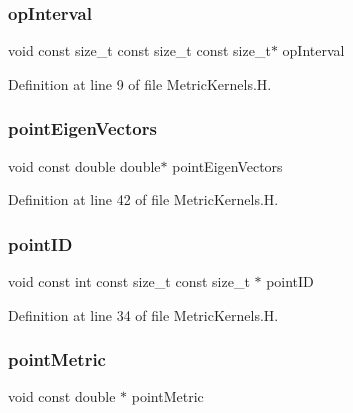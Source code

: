 \subsubsection{\texorpdfstring{op\+Interval}{opInterval}}
{\footnotesize\ttfamily void const size\+\_\+t const size\+\_\+t const size\+\_\+t$\ast$ op\+Interval}



Definition at line 9 of file Metric\+Kernels.\+H.

\hypertarget{MetricKernels_8H_a54f8f8da2da23aec4d7ad54db95b3d46}{}\label{MetricKernels_8H_a54f8f8da2da23aec4d7ad54db95b3d46} 
\subsubsection{\texorpdfstring{point\+Eigen\+Vectors}{pointEigenVectors}}
{\footnotesize\ttfamily void const double double$\ast$ point\+Eigen\+Vectors}



Definition at line 42 of file Metric\+Kernels.\+H.

\hypertarget{MetricKernels_8H_a6c2117dcce3a27f5b4903c92ca4b9909}{}\label{MetricKernels_8H_a6c2117dcce3a27f5b4903c92ca4b9909} 
\subsubsection{\texorpdfstring{point\+ID}{pointID}}
{\footnotesize\ttfamily void const int const size\+\_\+t const size\+\_\+t $\ast$ point\+ID}



Definition at line 34 of file Metric\+Kernels.\+H.

\hypertarget{MetricKernels_8H_a402c2cf8bde8ab216d05d4da8ccb34b4}{}\label{MetricKernels_8H_a402c2cf8bde8ab216d05d4da8ccb34b4} 
\subsubsection{\texorpdfstring{point\+Metric}{pointMetric}}
{\footnotesize\ttfamily void const double $\ast$ point\+Metric}




